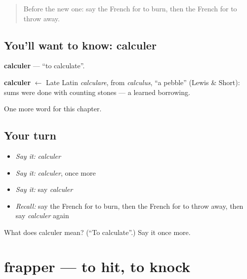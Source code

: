 \label{lesson:FR-C236-calculer}



\begin{quote}
Before the new one: say the French for to burn, then the French for to throw away.
\end{quote}

\subsection*{You'll want to know: calculer}
\textbf{calculer} — \textquotedblleft{}to calculate\textquotedblright{}.

\begin{cousinweb}
\textbf{calculer} $\leftarrow$ Late Latin \emph{calculare}, from \emph{calculus}, \textquotedblleft{}a pebble\textquotedblright{} (Lewis \& Short): sums were done with counting stones — a learned borrowing.
\end{cousinweb}

\begin{grammarlens}[title={What you've built}]
One more word for this chapter.
\end{grammarlens}

\subsection*{Your turn}
\begin{itemize}
\raggedright
  \item \emph{Say it:} \emph{calculer}
  \item \emph{Say it:} \emph{calculer}, once more
  \item \emph{Say it:} say \emph{calculer}
  \item \emph{Recall:} say the French for to burn, then the French for to throw away, then say \emph{calculer} again
\end{itemize}

\begin{tcolorbox}[breakable,colback=teal!4,colframe=teal!35!black,title={Before you move on}]
What does calculer mean? (\textquotedblleft{}To calculate\textquotedblright{}.) Say it once more.
\end{tcolorbox}
\section[frapper]{frapper — to hit, to knock}

\label{lesson:FR-C236-frapper}



